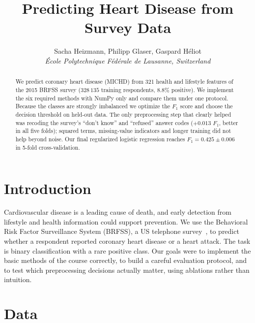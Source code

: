 \documentclass[10pt,conference,compsocconf]{IEEEtran}
\begin{document}
\title{Predicting Heart Disease from Survey Data}

\author{
  Sacha Heizmann, Philipp Glaser, Gaspard Héliot \\
  \textit{École Polytechnique Fédérale de Lausanne, Switzerland}\\
  
}

\maketitle

\begin{abstract}
  We predict coronary heart disease (MICHD) from 321 health and
  lifestyle features of the 2015 BRFSS survey ($328\,135$ training
  respondents, $8.8\%$ positive). We implement the six required methods
  with NumPy only and compare them under one protocol. Because the
  classes are strongly imbalanced we optimize the $F_1$ score and choose
  the decision threshold on held-out data. The only preprocessing step
  that clearly helped was recoding the survey's ``don't know'' and
  ``refused'' answer codes ($+0.013$ $F_1$, better in all five folds);
  squared terms, missing-value indicators and longer training did not
  help beyond noise. Our final regularized logistic regression reaches
  $F_1 = 0.425 \pm 0.006$ in 5-fold cross-validation.
\end{abstract}

\section{Introduction}

Cardiovascular disease is a leading cause of death, and early detection
from lifestyle and health information could support prevention. We
use the Behavioral Risk Factor Surveillance System (BRFSS), a US
telephone survey~\cite{brfss}, to predict whether a respondent
reported coronary heart disease or a heart attack. The task is binary
classification with a rare positive class. Our goals were to implement
the basic methods of the course correctly, to build a careful
evaluation protocol, and to test which preprocessing decisions
actually matter, using ablations rather than intuition.

\section{Data}
\label{sec:data}
\end{document}

